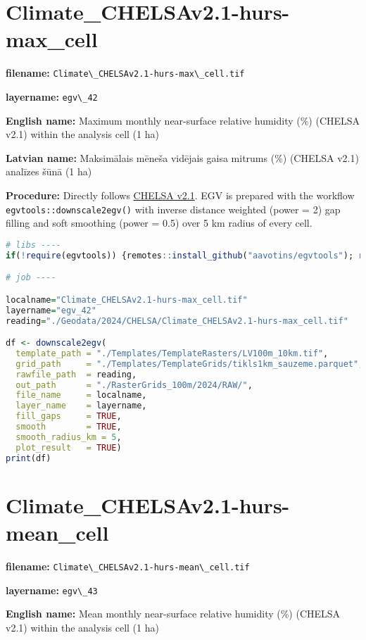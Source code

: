 \documentclass[
]{book}
\newcommand{\passthrough}[1]{#1}
\begin{document}
\section{Climate\_CHELSAv2.1-hurs-max\_cell}\label{ch06.042}

\textbf{filename:} \passthrough{\lstinline!Climate\_CHELSAv2.1-hurs-max\_cell.tif!}

\textbf{layername:} \passthrough{\lstinline!egv\_42!}

\textbf{English name:} Maximum monthly near-surface relative humidity (\%) (CHELSA v2.1) within the analysis cell (1 ha)

\textbf{Latvian name:} Maksimālais mēneša vidējais gaisa mitrums (\%) (CHELSA v2.1) analīzes šūnā (1 ha)

\textbf{Procedure:} Directly follows \hyperref[Ch04.11]{CHELSA v2.1}. EGV is prepared with the
workflow \passthrough{\lstinline!egvtools::downscale2egv()!} with inverse distance weighted (power = 2)
gap filling and soft smoothing (power = 0.5) over 5 km radius of every cell.

\begin{lstlisting}[language=R]
# libs ----
if(!require(egvtools)) {remotes::install_github("aavotins/egvtools"); require(egvtools)}

# job ----

localname="Climate_CHELSAv2.1-hurs-max_cell.tif"
layername="egv_42"
reading="./Geodata/2024/CHELSA/Climate_CHELSAv2.1-hurs-max_cell.tif"

df <- downscale2egv(
  template_path = "./Templates/TemplateRasters/LV100m_10km.tif",
  grid_path     = "./Templates/TemplateGrids/tikls1km_sauzeme.parquet",
  rawfile_path  = reading,
  out_path      = "./RasterGrids_100m/2024/RAW/",
  file_name     = localname,
  layer_name    = layername,
  fill_gaps     = TRUE,
  smooth        = TRUE,
  smooth_radius_km = 5,
  plot_result   = TRUE)
print(df)
\end{lstlisting}

\section{Climate\_CHELSAv2.1-hurs-mean\_cell}\label{ch06.043}

\textbf{filename:} \passthrough{\lstinline!Climate\_CHELSAv2.1-hurs-mean\_cell.tif!}

\textbf{layername:} \passthrough{\lstinline!egv\_43!}

\textbf{English name:} Mean monthly near-surface relative humidity (\%) (CHELSA v2.1) within the analysis cell (1 ha)
\end{document}
